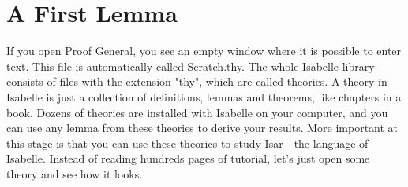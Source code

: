 \documentclass[11pt]{article}
\begin{document}
\section{A First Lemma}

If you open Proof General, you see an empty window where it is possible to enter text. This file is automatically called Scratch.thy. The whole Isabelle library consists of files with the extension "thy", which are called theories. A theory in Isabelle is just a collection of definitions, lemmas and theorems, like chapters in a book. Dozens of theories are installed with Isabelle on your computer, and you can use any lemma from these theories to derive your results. More important at this stage is that you can use these theories to study Isar - the language of Isabelle. Instead of reading hundreds pages of tutorial, let's just open some theory and see how it looks.
\end{document}
